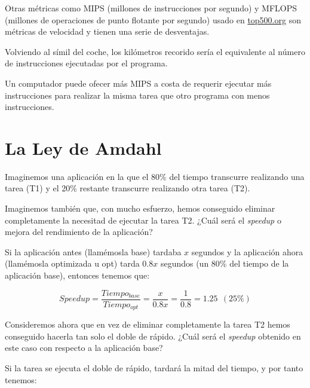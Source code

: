 \documentclass[12pt,onecolumn]{memoir}
\begin{document}
Otras métricas como MIPS (millones de instrucciones por segundo) y
MFLOPS (millones de operaciones de punto flotante por segundo) usado
en \url{top500.org} son métricas de velocidad y tienen una serie de
desventajas.

Volviendo al símil del coche, los kilómetros recorido sería el
equivalente al número de instrucciones ejecutadas por el programa.

Un computador puede ofecer más MIPS a costa de requerir ejecutar más
instrucciones para realizar la misma tarea que otro programa con menos
instrucciones.

\section{La Ley de Amdahl}

Imaginemos una aplicación en la que el 80\% del tiempo transcurre
realizando una tarea (T1) y el 20\% restante transcurre realizando otra
tarea (T2).

\begin{center}
\end{center}

Imaginemos también que, con mucho esfuerzo, hemos conseguido eliminar
completamente la necesitad de ejecutar la tarea
T2. ¿Cuál será el \emph{speedup} o mejora del rendimiento de la aplicación?

Si la aplicación antes (llamémosla base) tardaba $x$ segundos y la
aplicación ahora (llamémosla optimizada u opt) tarda 0.8$x$
segundos (un 80\% del tiempo de la aplicación base), entonces tenemos que:

\[ Speedup = \frac{Tiempo_{base}}{Tiempo_{opt}} = \frac{x}{0.8x} =
\frac{1}{0.8} = 1.25 ~ ~ (25\%) \]

Consideremos ahora que en vez de eliminar completamente la tarea T2
hemos conseguido hacerla tan solo el doble de rápido. ¿Cuál será el
\emph{speedup} obtenido en este caso con respecto a la aplicación base?

Si la tarea se ejecuta el doble de
rápido, tardará la mitad del tiempo, y por tanto tenemos:
\end{document}
